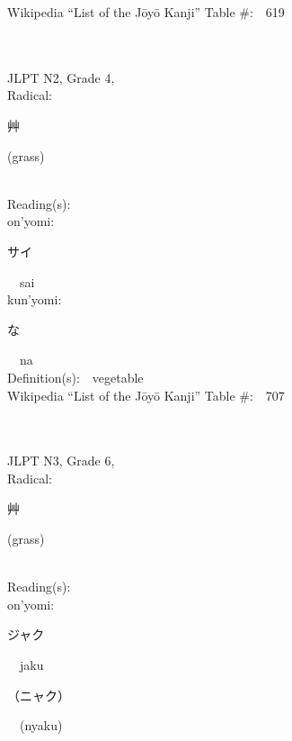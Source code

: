 \begin{multicols}{2}
Wikipedia ``List of the J\=oy\=o Kanji'' Table \#:\ \ 619 \\
\ \ \\
{\fontsize{34pt}{40pt}  }\ \ \\  %
{JLPT N2, Grade 4, \\Radical:\ \ {\begin{CJK}{UTF8}{min} 艸 \end{CJK}} (grass) } \\
Reading(s):\ \ \\
{\hspace*{1em}}on'yomi:\ \ \\
{\hspace*{2em}}{\begin{CJK}{UTF8}{min} サイ \end{CJK}}\ \ sai\ \ \\
{\hspace*{1em}}kun'yomi:\ \ \\
{\hspace*{2em}}{\begin{CJK}{UTF8}{min} な \end{CJK}}\ \ na\ \ \\
Definition(s):\ \ vegetable \\
Wikipedia ``List of the J\=oy\=o Kanji'' Table \#:\ \ 707 \\
\ \ \\
{\fontsize{34pt}{40pt}  }\ \ \\  %
{JLPT N3, Grade 6, \\Radical:\ \ {\begin{CJK}{UTF8}{min} 艸 \end{CJK}} (grass) } \\
Reading(s):\ \ \\
{\hspace*{1em}}on'yomi:\ \ \\
{\hspace*{2em}}{\begin{CJK}{UTF8}{min} ジャク \end{CJK}}\ \ jaku\ \ \\
{\hspace*{2em}}{\begin{CJK}{UTF8}{min} （ニャク） \end{CJK}}\ \ (nyaku)\ \ \\

\end{multicols}
